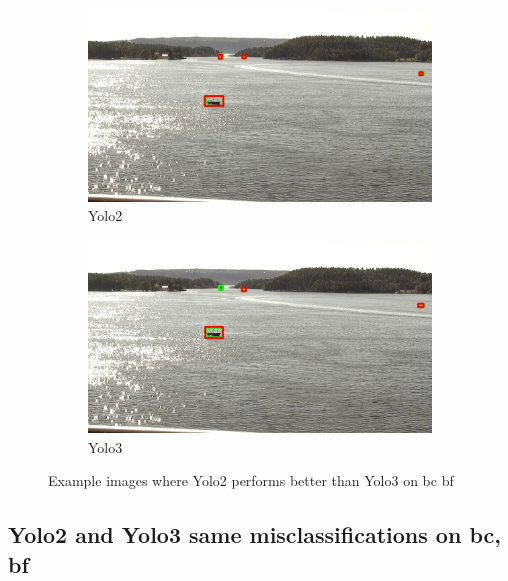 \begin{figure}[h!]
\begin{subfigure}{.5\textwidth}
  \centering
  \includegraphics[width=0.9\linewidth]{results/case_buildings/yolo23/2better/yolo2/selected_08_11_frame0530.jpg}
  \caption{Yolo2}
\end{subfigure}%
\begin{subfigure}{.5\textwidth}
  \centering
  \includegraphics[width=.9\linewidth]{results/case_buildings/yolo23/2better/yolo3/selected_08_11_frame0530.jpg}
  \caption{Yolo3}
\end{subfigure}
\caption{Example images where Yolo2 performs better than Yolo3 on bc bf}
\label{img:yolo2_better}

\end{figure}

\newpage

\subsection{Yolo2 and Yolo3 same misclassifications on bc, bf}
\label{sec:same_mistake}


